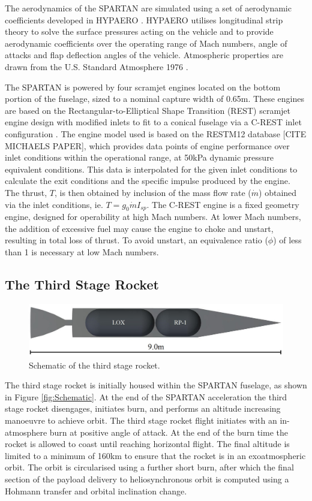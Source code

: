 \documentclass[]{aiaa-tc}
\begin{document}
The aerodynamics of the SPARTAN are simulated using a set of aerodynamic coefficients developed in HYPAERO \cite{Jazra2009}. HYPAERO utilises longitudinal strip theory to solve the surface pressures acting on the vehicle and to provide aerodynamic coefficients over the operating range of Mach numbers, angle of attacks and flap deflection angles of the vehicle. Atmospheric properties are drawn from the U.S. Standard Atmosphere 1976 \cite{Administration1976}. 

The SPARTAN is powered by four scramjet engines located on the bottom portion of the fuselage, sized to a nominal capture width of 0.65m. These engines are based on the Rectangular-to-Elliptical Shape Transition (REST) scramjet engine design \cite{Suraweera2009} with modified inlets to fit to a conical fuselage via a C-REST inlet configuration \cite{Gollan2010}. 
The engine model used is based on the RESTM12 database [CITE MICHAELS PAPER], which provides data points of engine performance over inlet conditions within the operational range, at 50kPa dynamic pressure equivalent conditions. This data is interpolated for the given inlet conditions to calculate the exit conditions and the specific impulse produced by the engine. The thrust, $T$, is then obtained by inclusion of the mass flow rate ($\dot{m}$) obtained via the inlet conditions, ie. $T = g_0\dot{m}I_{sp}$.
The C-REST engine is a fixed geometry engine, designed for operability at high Mach numbers. At lower Mach numbers, the addition of excessive fuel may cause the engine to choke and unstart, resulting in total loss of thrust. To avoid unstart, an equivalence ratio ($\phi$) of less than 1 is necessary at low Mach numbers. 


\subsection{The Third Stage Rocket}\label{section:rocket}
\begin{figure}[ht]
	\centering
	\includegraphics[width=0.6\linewidth]{3rdStage}
	\caption{Schematic of the third stage rocket.}
	\label{fig:ThirdStage}
\end{figure}

The third stage rocket is initially housed within the SPARTAN fuselage, as shown in Figure \ref{fig:Schematic}. At the end of the SPARTAN acceleration the third stage rocket disengages, initiates burn, and performs an altitude increasing manoeuvre to achieve orbit. 
The third stage rocket flight initiates with an in-atmosphere burn at positive angle of attack. 
At the end of the burn time the rocket is allowed to coast until reaching horizontal flight. The final altitude is limited to a minimum of 160km to ensure that the rocket is in an exoatmospheric orbit. The orbit is circularised using a further short burn, after which the final section of the payload delivery to heliosynchronous orbit is computed using a Hohmann transfer and orbital inclination change.
\end{document}
